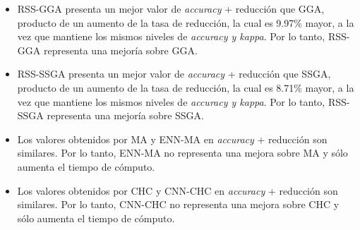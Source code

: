 \begin{itemize}

\item RSS-GGA presenta un mejor valor de \emph{accuracy} + reducción que GGA, producto de un aumento de la tasa de reducción, la cual es 9.97\% mayor, a la vez que mantiene los mismos niveles de \emph{accuracy y kappa}. Por lo tanto, RSS-GGA representa una mejoría sobre GGA.

\item RSS-SSGA presenta un mejor valor de \emph{accuracy} + reducción que SSGA, producto de un aumento de la tasa de reducción, la cual es 8.71\% mayor, a la vez que mantiene los mismos niveles de \emph{accuracy y kappa}. Por lo tanto, RSS-SSGA representa una mejoría sobre SSGA.

\item Los valores obtenidos por MA y ENN-MA en \emph{accuracy} + reducción son similares. Por lo tanto, ENN-MA no representa una mejora sobre MA y sólo aumenta el tiempo de cómputo.

\item  Los valores obtenidos por CHC y CNN-CHC en \emph{accuracy} + reducción son similares. Por lo tanto, CNN-CHC no representa una mejora sobre CHC y sólo aumenta el tiempo de cómputo.

\end{itemize}

